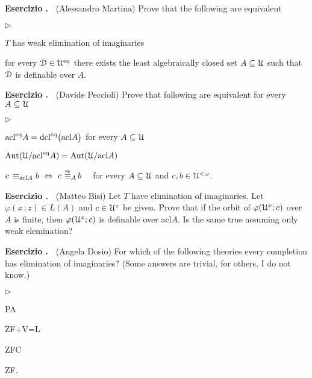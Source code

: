 \documentclass[10pt]{article}
\def\phi{\varphi}
\def\D{\EuScript D}
\def\U{\EuScript U}
\def\IFF{\Leftrightarrow}
\def\Aut{\textrm{Aut}}
\def\acl{\textrm{acl}}
\def\dcl{\textrm{dcl}}
\def\eq{{\rm eq}}
\def\equivSh{\stackrel{\smash{\scalebox{.5}{\rm Sh}}}{\equiv}}
\newcommand{\labella}[1]{{\sf\footnotesize #1}\hfill}
\renewenvironment{itemize}
  {\begin{list}{$\triangleright$}{%
   \setlength{\parskip}{0mm}
   \setlength{\topsep}{0mm}
   \setlength{\rightmargin}{0mm}
   \setlength{\listparindent}{0mm}
   \setlength{\itemindent}{0mm}
   \setlength{\labelwidth}{3ex}
   \setlength{\itemsep}{0mm}
   \setlength{\parsep}{0mm}
   \setlength{\partopsep}{0mm}
   \setlength{\labelsep}{1ex}
   \setlength{\leftmargin}{\labelwidth+\labelsep}
   \let\makelabel\labella}}{%
   \vspace*{-.3\baselineskip}
  \end{list}}
\newcounter{ex}
\newenvironment{exercise}{\bigskip\addtocounter{ex}{1}\textbf{Esercizio \theex.\ }}{}
\begin{document}
\begin{exercise}
  (Alessandro Martina)
  Prove that the following are equivalent
  \begin{itemize}
  \item[1.] $T$ has weak elimination of imaginaries
  \item[2.] for every $\D\in \U^\eq$ there exists the least algebraically closed set $A\subseteq\U$ such that $\D$ is definable over $A$.
  \end{itemize}
\end{exercise}

\begin{exercise}
  (Davide Peccioli)
  Prove that following are equivalent for every $A\subseteq\U$
  \begin{itemize}
  \item[1.]  $\acl^\eq A=\dcl^\eq\big(\acl A\big)$ for every $A\subseteq\U$
  \item[2.]  $\Aut(\U/\acl^\eq A)= \Aut(\U/\acl A)$
  \item[3.] $c\,\equiv_{\acl A}b\ \IFF\ c\ \smash{\equivSh_A}\, b$ \ \ for every $A\subseteq\U$ and  $c,b\in\U^{<\omega}$.
  \end{itemize} 
\end{exercise}

\begin{exercise}
  (Matteo Bisi)
  Let $T$ have elimination of imaginaries.
  Let $\phi(x\,;z)\in L(A)$ and  $c\in\U^z$ be given.
  Prove that if the orbit of $\phi(\U^x; c)$ over $A$ is finite, then $\phi(\U^x; c)$ is definable over $\acl A$.
  Is the same true assuming only weak elemination?
\end{exercise}

\begin{exercise}
  (Angela Dosio)
  For which of the following theories every completion has elimination of imaginaries?
  (Some answers are trivial, for others, I do not know.)
  \begin{itemize}
    \item [1.] PA
    \item [2.] ZF+V=L
    \item [3.] ZFC
    \item [4.] ZF.
  \end{itemize}
\end{exercise}
\end{document}
